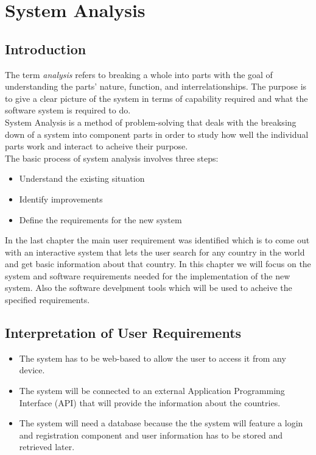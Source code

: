 \documentclass[twoside, a4paper, 12pt]{report}
\begin{document}
\chapter{System Analysis}
\section{Introduction}
The term \textit{analysis} refers to breaking a whole into parts with the goal of understanding the parts' nature, function, and interrelationships. The purpose is to give a clear picture of the system in terms of capability required and what the software system is required to do.\autocite{dennis2009systems} \\
\indent
System Analysis is a method of problem-solving that deals with the breaksing down of a system into component parts in order to study how well the individual parts work and interact to acheive their purpose.\\
\indent
The basic process of system analysis involves three steps:
\begin{itemize}
	\item Understand the existing situation
	\item Identify improvements
	\item Define the requirements for the new system
\end{itemize}
\indent
In the last chapter the main user requirement was identified which is to come out with an interactive system that lets the user search for any country in the world and get basic information about that country. In this chapter we will focus on the system and software requirements needed for the implementation of the new system. Also the software develpment tools which will be used to acheive the specified requirements.

\section{Interpretation of User Requirements}
\begin{itemize}
	\item The system has to be web-based to allow the user to access it from any device.
	\item The system will be connected to an external Application Programming Interface (API) that will provide the information about the countries.
	\item The system will need a database because the the system will feature a login and registration component and user information has to be stored and retrieved later.
\end{itemize}
\end{document}
